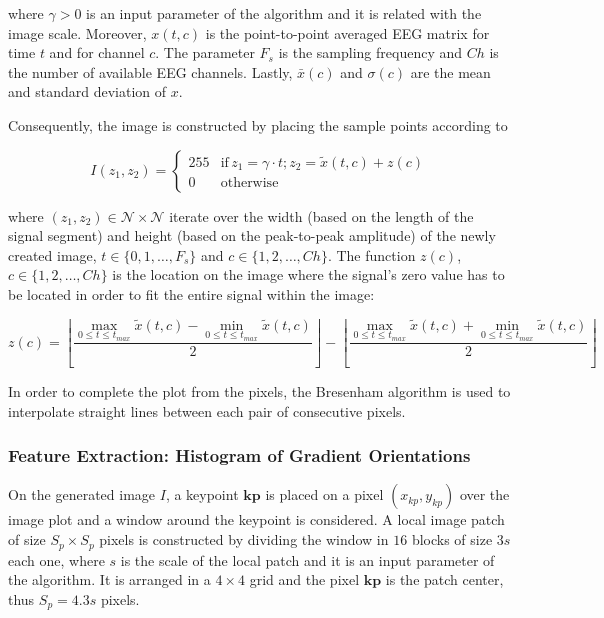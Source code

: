 \documentclass[entropy,article,submit,moreauthors,pdftex,10pt,a4paper]{mdpi}
\begin{document}
\noindent where $\gamma > 0$ is an input parameter of the algorithm and  it is related with the image scale. Moreover, $ x(t,c) $ is the point-to-point averaged EEG matrix for time $t$ and for channel $c$. The parameter $F_s$ is the sampling frequency and $Ch$ is the number of available EEG channels. Lastly, $\bar{x}(c)$ and $ \sigma (c) $ are the mean and standard deviation of $x$.

Consequently, the image is constructed by placing the sample points according to

\begin{equation}
I(z_1,z_2) = \left\{ \begin{array}{rl}
255 & \text{if} \,  z_1 = \gamma \cdot t; z_2 = \tilde{x}(t,c) + z(c) \\
0   & \mbox{otherwise}
\end{array}\right.
\label{eq:images}
\end{equation}

\noindent where $ (z_1,z_2) \in \mathcal{N} \times \mathcal{N}$ iterate over the width (based on the length of the signal segment) and height (based on the peak-to-peak amplitude) of the newly created image,  $t \in \{0, 1, \dots, F_s\}$ and $c \in \{1,2,\dots,Ch\}$.  The function $z(c)$, $c \in \{1,2,\dots,Ch\}$ is the location on the image where the signal's zero value has to be located in order to fit the entire signal within the image:

\begin{equation}
z(c) = \left \lfloor{ \frac{\max_{0 \leq t\leq t_{max}} \tilde{x}(t,c)  - \min_{0 \leq t\leq t_{max}} \tilde{x}(t,c) }{2} }\right \rfloor -   \left \lfloor{ \frac{\max_{0 \leq t\leq t_{max}} \tilde{x}(t,c)  + \min_{0 \leq t\leq t_{max}} \tilde{x}(t,c)}{ 2} }\right \rfloor
\label{eq:zerolevel}
\end{equation}
  
In order to complete the plot from the pixels, the Bresenham \citep{Bresenham1965,Ramele2016} algorithm is used to interpolate straight lines between each pair of  consecutive pixels.


\subsubsection{Feature Extraction: Histogram of Gradient Orientations}
\label{SIFT}


On the generated image $I$, a keypoint $\mathbf{kp}$ is placed on a pixel $(x_{kp}, y_{kp})$ over the image plot and a window around the keypoint is considered. A local image patch of size $S_p \times S_p$ pixels is constructed by dividing the window in $16$ blocks of size $3s$ each one,  where $s$ is the scale of the local patch and it is an input parameter of the algorithm. It is arranged in a $4 \times 4$ grid and the pixel $ \mathbf{kp}$ is the patch center, thus $S_p = 4.3s $ pixels. 
\end{document}
